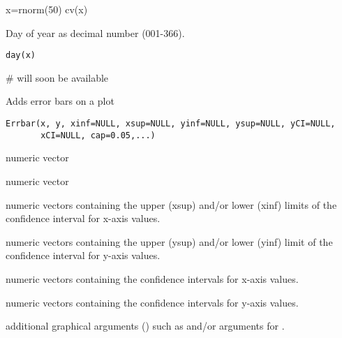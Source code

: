 \documentclass[a4paper]{book}
\begin{document}
%
\begin{Examples}
\begin{ExampleCode}
x=rnorm(50)
cv(x)
\end{ExampleCode}
\end{Examples}
\newpage
{}
%
\begin{Description}\relax
Day of year as decimal number (001-366).
\end{Description}
%
\begin{Usage}
\begin{verbatim}
day(x)
\end{verbatim}
\end{Usage}
%
\begin{Arguments}
\begin{ldescription}
\item[\code{x}] 


\end{ldescription}
\end{Arguments}
%
\begin{Examples}
\begin{ExampleCode}
# will soon be available
\end{ExampleCode}
\end{Examples}
\newpage
{}
%
\begin{Description}\relax
Adds error bars on a plot
\end{Description}
%
\begin{Usage}
\begin{verbatim}
Errbar(x, y, xinf=NULL, xsup=NULL, yinf=NULL, ysup=NULL, yCI=NULL,
       xCI=NULL, cap=0.05,...)
\end{verbatim}
\end{Usage}
%
\begin{Arguments}
\begin{ldescription}
\item[\code{x }] numeric vector

\item[\code{y}] numeric vector

\item[\code{xinf, xsup}] numeric vectors containing the upper (xsup) and/or lower (xinf)
limits of the confidence interval for x-axis values.

\item[\code{yinf, ysup}] numeric vectors containing the upper (ysup) and/or lower (yinf)
limit of the confidence interval for y-axis values.

\item[\code{xCI}] numeric vectors containing the confidence intervals for x-axis values.

\item[\code{yCI}] numeric vectors containing the confidence intervals for y-axis values.

\item[\code{...}] additional graphical arguments () such as 
and/or arguments for  .

\end{ldescription}
\end{Arguments}
\end{document}
